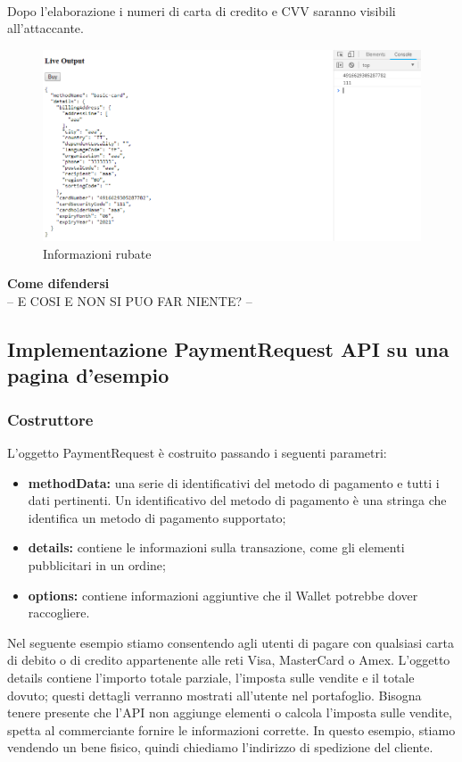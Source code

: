 \documentclass[11pt ,a4paper , twoside , openright ]{article}
\begin{document}
\pagebreak
\\
Dopo l'elaborazione i numeri di carta di credito e CVV saranno visibili all'attaccante.
\\
\begin{figure}[h]
	\centering
	\includegraphics[width=1\linewidth]{Informazioni}
	\caption{Informazioni rubate}
	\label{fig: Informazioni rubate}
\end{figure}
\textbf{Come difendersi}
\\
-- E COSI E NON SI PUO FAR NIENTE? --
\pagebreak
\subsection{Implementazione PaymentRequest API su una pagina d'esempio}
\subsubsection{Costruttore}
L'oggetto PaymentRequest è costruito passando i seguenti parametri:
\begin{itemize}
	\item \textbf{methodData:} una serie di identificativi del metodo di pagamento e tutti i dati pertinenti. Un identificativo del metodo di pagamento è una stringa che identifica un metodo di pagamento supportato;
	\item \textbf{details:} contiene le informazioni sulla transazione, come gli elementi pubblicitari in un ordine;
	\item \textbf{options:} contiene informazioni aggiuntive che il Wallet potrebbe dover raccogliere.
\end{itemize}

Nel seguente esempio stiamo consentendo agli utenti di pagare con qualsiasi carta di debito o di credito appartenente alle reti Visa, MasterCard o Amex. L'oggetto details contiene l'importo totale parziale, l'imposta sulle vendite e il totale dovuto; questi dettagli verranno mostrati all'utente nel portafoglio. Bisogna tenere presente che l'API non aggiunge elementi o calcola l'imposta sulle vendite, spetta al commerciante fornire le informazioni corrette. In questo esempio, stiamo vendendo un bene fisico, quindi chiediamo l'indirizzo di spedizione del cliente.

\end{document}
